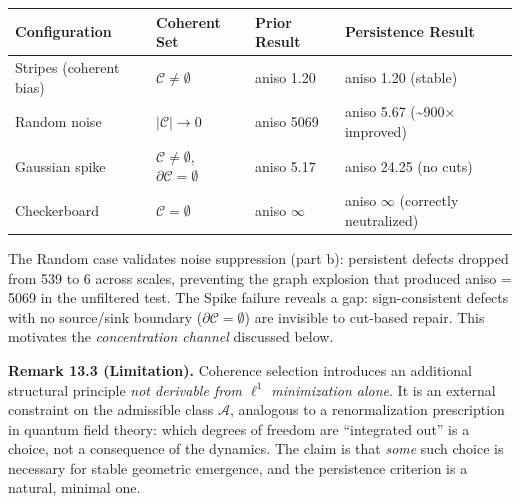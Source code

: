 \documentclass[
]{article}
\begin{document}
\begin{longtable}[]{@{}
  >{\raggedright\arraybackslash}p{}
  >{\centering\arraybackslash}p{}
  >{\centering\arraybackslash}p{}
  >{\centering\arraybackslash}p{}@{}}
\toprule\noalign{}
\begin{minipage}[b]{\linewidth}\raggedright
Configuration
\end{minipage} & \begin{minipage}[b]{\linewidth}\centering
Coherent Set
\end{minipage} & \begin{minipage}[b]{\linewidth}\centering
Prior Result
\end{minipage} & \begin{minipage}[b]{\linewidth}\centering
Persistence Result
\end{minipage} \\
\midrule\noalign{}
\endhead
\bottomrule\noalign{}
\endlastfoot
Stripes (coherent bias) & \(\mathcal{C} \neq \emptyset\) & aniso 1.20 &
aniso 1.20 (stable) \\
Random noise & \(|\mathcal{C}| \to 0\) & aniso 5069 & aniso 5.67
(\textasciitilde900× improved) \\
Gaussian spike & \(\mathcal{C} \neq \emptyset\),
\(\partial\mathcal{C} = \emptyset\) & aniso 5.17 & aniso 24.25 (no
cuts) \\
Checkerboard & \(\mathcal{C} = \emptyset\) & aniso \(\infty\) & aniso
\(\infty\) (correctly neutralized) \\
\end{longtable}

The Random case validates noise suppression (part b): persistent defects
dropped from 539 to 6 across scales, preventing the graph explosion that
produced aniso = 5069 in the unfiltered test. The Spike failure reveals
a gap: sign-consistent defects with no source/sink boundary
(\(\partial\mathcal{C} = \emptyset\)) are invisible to cut-based repair.
This motivates the \emph{concentration channel} discussed below.

\textbf{Remark 13.3 (Limitation).} Coherence selection introduces an
additional structural principle \emph{not derivable from \(\ell^1\)
minimization alone}. It is an external constraint on the admissible
class \(\mathcal{A}\), analogous to a renormalization prescription in
quantum field theory: which degrees of freedom are ``integrated out'' is
a choice, not a consequence of the dynamics. The claim is that
\emph{some} such choice is necessary for stable geometric emergence, and
the persistence criterion is a natural, minimal one.
\end{document}
